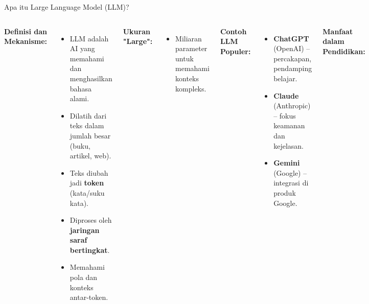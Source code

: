 \documentclass[aspectratio=169, table]{beamer}
\begin{document}
		
		\begin{frame}[fragile]{Apa itu Large Language Model (LLM)?}
			\vspace{20pt}
			\begin{columns}[T]
				\small
				\textbf{Definisi dan Mekanisme:}
				\begin{itemize}
					\item LLM adalah AI yang memahami dan menghasilkan bahasa alami.
					\item Dilatih dari teks dalam jumlah besar (buku, artikel, web).
					\item Teks diubah jadi \textbf{token} (kata/suku kata).
					\item Diproses oleh \textbf{jaringan saraf bertingkat}.
					\item Memahami pola dan konteks antar-token.
				\end{itemize}
				
				\vspace{5pt}
				\textbf{Ukuran "Large":}
				\begin{itemize}
					\item Miliaran parameter untuk memahami konteks kompleks.
				\end{itemize}
				
				\small
				\textbf{Contoh LLM Populer:}
				\begin{itemize}
					\item \textbf{ChatGPT} (OpenAI) – percakapan, pendamping belajar.
					\item \textbf{Claude} (Anthropic) – fokus keamanan dan kejelasan.
					\item \textbf{Gemini} (Google) – integrasi di produk Google.
				\end{itemize}
				
				\textbf{Manfaat dalam Pendidikan:}
				\begin{itemize}
					\item Termasuk generative AI.
					\item Membantu guru menyiapkan materi dan umpan balik.
					\item Mendukung pembelajaran personal.
				\end{itemize}
			\end{columns}
		\end{frame}
	
\end{document}
